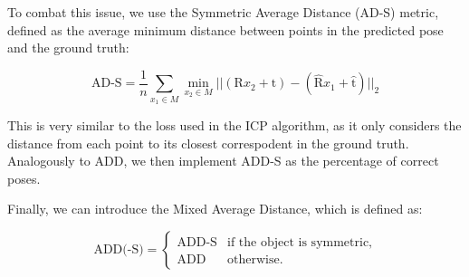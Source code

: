 To combat this issue, we use the Symmetric Average Distance (AD-S)\cite{PoseCNN} metric, defined as the average minimum distance between points in the predicted pose and the ground truth:

\begin{equation*}
    \text{AD-S} = \frac{1}{n} \sum_{x_1 \in M} \min_{x_2 \in M} ||(\text{R}x_2 + \text{t}) - 
    (\hat{\text{R}}x_1 + \hat{\text{t}})||_2
\end{equation*}

This is very similar to the loss used in the ICP algorithm, as it only considers the distance from each point to its closest correspodent in the ground truth. Analogously to ADD, we then implement ADD-S as the percentage of correct poses.

Finally, we can introduce the Mixed Average Distance, which is defined as:

\begin{equation*}
    \text{ADD(-S)} = 
    \begin{cases}
        \text{ADD-S} & \text{if the object is symmetric,}\\
        \text{ADD} & \text{otherwise.}
    \end{cases}
\end{equation*}
